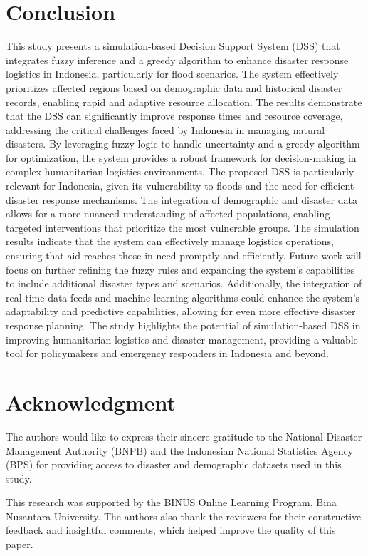 \documentclass[journal,final,a4paper,twoside,11pt]{IEEEtran}
\begin{document}
\section{Conclusion}
This study presents a simulation-based Decision Support System (DSS) that integrates fuzzy inference and a greedy algorithm to enhance disaster response logistics in Indonesia, particularly for flood scenarios. The system effectively prioritizes affected regions based on demographic data and historical disaster records, enabling rapid and adaptive resource allocation.
The results demonstrate that the DSS can significantly improve response times and resource coverage, addressing the critical challenges faced by Indonesia in managing natural disasters. By leveraging fuzzy logic to handle uncertainty and a greedy algorithm for optimization, the system provides a robust framework for decision-making in complex humanitarian logistics environments.
The proposed DSS is particularly relevant for Indonesia, given its vulnerability to floods and the need for efficient disaster response mechanisms. The integration of demographic and disaster data allows for a more nuanced understanding of affected populations, enabling targeted interventions that prioritize the most vulnerable groups. The simulation results indicate that the system can effectively manage logistics operations, ensuring that aid reaches those in need promptly and efficiently.
Future work will focus on further refining the fuzzy rules and expanding the system's capabilities to include additional disaster types and scenarios. Additionally, the integration of real-time data feeds and machine learning algorithms could enhance the system's adaptability and predictive capabilities, allowing for even more effective disaster response planning. The study highlights the potential of simulation-based DSS in improving humanitarian logistics and disaster management, providing a valuable tool for policymakers and emergency responders in Indonesia and beyond.

\section*{Acknowledgment}

The authors would like to express their sincere gratitude to the National Disaster Management Authority (BNPB) and the Indonesian National Statistics Agency (BPS) for providing access to disaster and demographic datasets used in this study. 

This research was supported by the BINUS Online Learning Program, Bina Nusantara University. The authors also thank the reviewers for their constructive feedback and insightful comments, which helped improve the quality of this paper.





 




\label{lastPage}
\end{document}
